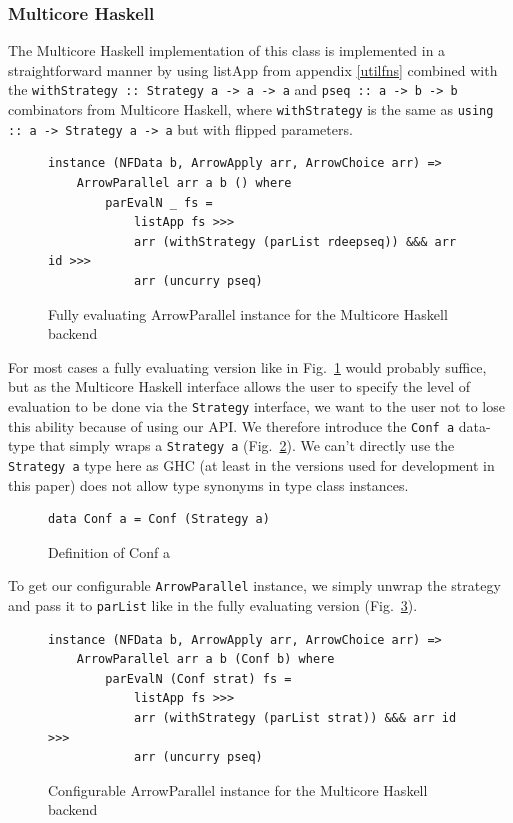 \documentclass{jfp1}
\newcommand{\inlinecode}[1]{\texttt{#1}}
\begin{document}
\subsubsection{Multicore Haskell} \label{sec:parrows:multicore}
The Multicore Haskell implementation of this class is implemented in a straightforward manner by using listApp from appendix \ref{utilfns} combined with the \inlinecode{withStrategy :: Strategy a -> a -> a} and \inlinecode{pseq :: a -> b -> b} combinators from Multicore Haskell, where \inlinecode{withStrategy} is the same as \inlinecode{using :: a -> Strategy a -> a} but with flipped parameters.
\begin{figure}[h]
\begin{lstlisting}[frame=htrbl]
instance (NFData b, ArrowApply arr, ArrowChoice arr) =>
	ArrowParallel arr a b () where
    	parEvalN _ fs =
       		listApp fs >>>
        	arr (withStrategy (parList rdeepseq)) &&& arr id >>>
        	arr (uncurry pseq)
\end{lstlisting}%
\caption{Fully evaluating ArrowParallel instance for the Multicore Haskell backend}
\label{fig:ArrowParallelMulticoreRdeepseq}
\end{figure}
For most cases a fully evaluating version like in Fig.~\ref{fig:ArrowParallelMulticoreRdeepseq} would probably suffice, but as the Multicore Haskell interface allows the user to specify the level of evaluation to be done via the \inlinecode{Strategy} interface, we want to the user not to lose this ability because of using our API. We therefore introduce the \inlinecode{Conf a} data-type that simply wraps a \inlinecode{Strategy a} (Fig.~\ref{fig:confa}). We can't directly use the \inlinecode{Strategy a} type here as GHC (at least in the versions used for development in this paper) does not allow type synonyms in type class instances.
\begin{figure}[h]
\begin{lstlisting}[frame=htrbl]
data Conf a = Conf (Strategy a)
\end{lstlisting}
\caption{Definition of Conf a}
\label{fig:confa}
\end{figure}
To get our configurable \inlinecode{ArrowParallel} instance, we simply unwrap the strategy and pass it to \inlinecode{parList} like in the fully evaluating version (Fig.~\ref{fig:ArrowParallelMulticoreConfigurable}).
\begin{figure}[h]
\begin{lstlisting}[frame=htrbl]
instance (NFData b, ArrowApply arr, ArrowChoice arr) =>
	ArrowParallel arr a b (Conf b) where
    	parEvalN (Conf strat) fs =
        	listApp fs >>>
        	arr (withStrategy (parList strat)) &&& arr id >>>
        	arr (uncurry pseq)
\end{lstlisting}
\caption{Configurable ArrowParallel instance for the Multicore Haskell backend}
\label{fig:ArrowParallelMulticoreConfigurable}
\end{figure}
\end{document}
